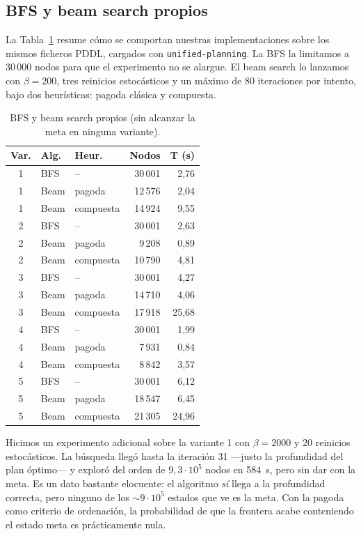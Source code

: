 \documentclass[conference,a4paper]{IEEEtran}
\begin{document}
\subsection{BFS y beam search propios}

La Tabla~\ref{tab:propios} resume cómo se comportan nuestras
implementaciones sobre los mismos ficheros PDDL, cargados con
\texttt{unified-planning}. La BFS la limitamos a 30\,000 nodos para que el
experimento no se alargue. El beam search lo lanzamos con $\beta=200$,
tres reinicios estocásticos y un máximo de 80 iteraciones por intento,
bajo dos heurísticas: pagoda clásica y compuesta.

\begin{table}[!htbp]
\caption{BFS y beam search propios (sin alcanzar la meta en ninguna variante).}
\label{tab:propios}
\centering
\begin{tabular}{cllrr}
\toprule
\textbf{Var.} & \textbf{Alg.} & \textbf{Heur.} & \textbf{Nodos} & \textbf{T (s)} \\
\midrule
1 & BFS  & --        & 30\,001 &  2,76 \\
1 & Beam & pagoda    & 12\,576 &  2,04 \\
1 & Beam & compuesta & 14\,924 &  9,55 \\
\midrule
2 & BFS  & --        & 30\,001 &  2,63 \\
2 & Beam & pagoda    &  9\,208 &  0,89 \\
2 & Beam & compuesta & 10\,790 &  4,81 \\
\midrule
3 & BFS  & --        & 30\,001 &  4,27 \\
3 & Beam & pagoda    & 14\,710 &  4,06 \\
3 & Beam & compuesta & 17\,918 & 25,68 \\
\midrule
4 & BFS  & --        & 30\,001 &  1,99 \\
4 & Beam & pagoda    &  7\,931 &  0,84 \\
4 & Beam & compuesta &  8\,842 &  3,57 \\
\midrule
5 & BFS  & --        & 30\,001 &  6,12 \\
5 & Beam & pagoda    & 18\,547 &  6,45 \\
5 & Beam & compuesta & 21\,305 & 24,96 \\
\bottomrule
\end{tabular}
\end{table}

Hicimos un experimento adicional sobre la variante 1 con $\beta=2000$ y
20 reinicios estocásticos. La búsqueda llegó hasta la iteración 31
---justo la profundidad del plan óptimo--- y exploró del orden de
$9{,}3\cdot 10^{5}$ nodos en 584~s, pero sin dar con la meta. Es un
dato bastante elocuente: el algoritmo \emph{sí} llega a la profundidad
correcta, pero ninguno de los $\sim 9\cdot 10^{5}$ estados que ve es la
meta. Con la pagoda como criterio de ordenación, la probabilidad de que
la frontera acabe conteniendo el estado meta es prácticamente nula.
\end{document}
